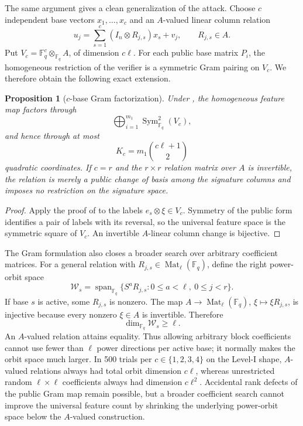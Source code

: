 \documentclass[11pt]{article}
\newtheorem{proposition}[theorem]{Proposition}
\newcommand{\F}{\mathbb F}
\newcommand{\Mat}{\operatorname{Mat}}
\newcommand{\Sym}{\operatorname{Sym}}
\newcommand{\Span}{\operatorname{span}}
\begin{document}
The same argument gives a clean generalization of the attack.  Choose
$c$ independent base vectors $x_1,\ldots,x_c$ and an $A$-valued linear
column relation
\begin{equation}\label{eq:cbase}
 u_j=\sum_{s=1}^{c}(I_n\otimes R_{j,s})x_s+v_j,
 \qquad R_{j,s}\in A.
\end{equation}
Put $V_c=\F_q^c\otimes_{\F_q}A$, of dimension $c\ell$.  For each public
base matrix $P_i$, the homogeneous restriction of the verifier is a symmetric
Gram pairing on $V_c$.  We therefore obtain the following exact extension.

\begin{proposition}[$c$-base Gram factorization]\label{prop:cbase}
Under , the homogeneous feature map factors through
\[
 \bigoplus_{i=1}^{m_1}\Sym^2_{\F_q}(V_c),
\]
and hence through at most
\[
 K_c=m_1\binom{c\ell+1}{2}
\]
quadratic coordinates.  If $c=r$ and the $r\times r$ relation matrix over
$A$ is invertible, the relation is merely a public change of basis among the
signature columns and imposes no restriction on the signature space.
\end{proposition}

\begin{proof}
Apply the proof of  to the labels
$e_s\otimes\xi\in V_c$.  Symmetry of the public form identifies a pair of
labels with its reversal, so the universal feature space is the symmetric
square of $V_c$.  An invertible $A$-linear column change is bijective.
\end{proof}

The Gram formulation also closes a broader search over arbitrary coefficient
matrices.  For a general relation with $R_{j,s}\in\Mat_\ell(\F_q)$, define
the right power-orbit space
\[
 \mathcal W_s=\Span_{\F_q}\{S^aR_{j,s}:0\le a<\ell,\ 0\le j<r\}.
\]
If base $s$ is active, some $R_{j,s}$ is nonzero.  The map
$A\to\Mat_\ell(\F_q)$, $\xi\mapsto\xi R_{j,s}$, is injective because every
nonzero $\xi\in A$ is invertible.  Therefore
\begin{equation}\label{eq:orbit-lower}
 \dim_{\F_q}\mathcal W_s\ge\ell.
\end{equation}
An $A$-valued relation attains equality.  Thus allowing arbitrary block
coefficients cannot use fewer than $\ell$ power directions per active base;
it normally makes the orbit space much larger.  In 500 trials per
$c\in\{1,2,3,4\}$ on the Level-I shape, $A$-valued relations always had
total orbit dimension $c\ell$, whereas unrestricted random
$\ell\times\ell$ coefficients always had dimension $c\ell^2$.  Accidental
rank defects of the public Gram map remain possible, but a broader coefficient
search cannot improve the universal feature count by shrinking the underlying
power-orbit space below the $A$-valued construction.
\end{document}
